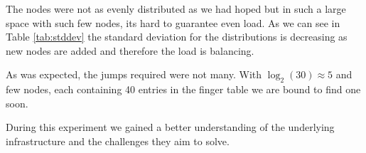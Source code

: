 The nodes were not as evenly distributed as we had hoped but in such a large space with such few nodes, its hard to guarantee even load. As we can see in Table \ref{tab:stddev} the standard deviation for the distributions is decreasing as new nodes are added and therefore the load is balancing.

As was expected, the jumps required were not many. With $\log_2(30) \approx 5$ and few nodes, each containing 40 entries in the finger table we are bound to find one soon.

During this experiment we gained a better understanding of the underlying infrastructure and the challenges they aim to solve.

